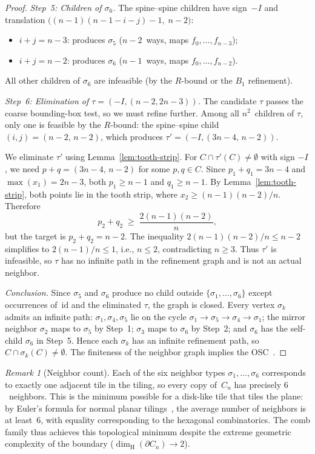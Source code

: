\documentclass{amsart}
\theoremstyle{definition}
\theoremstyle{remark}
\newtheorem{remark}[theorem]{Remark}
\newcommand{\dH}{\dim_{\mathrm{H}}}
\begin{document}
\begin{proof}
\emph{Step~5: Children of $\sigma_6$.}
The spine--spine children have sign~$-I$ and translation
$\bigl((n{-}1)(n{-}1{-}i{-}j) - 1,\; n{-}2\bigr)$:
\begin{itemize}
\item $i + j = n{-}3$: produces $\sigma_5$
  ($n{-}2$~ways, maps $f_0, \ldots, f_{n-3}$);
\item $i + j = n{-}2$: produces $\sigma_6$
  ($n{-}1$~ways, maps $f_0, \ldots, f_{n-2}$).
\end{itemize}
All other children of $\sigma_6$ are infeasible (by the $R$-bound or
the $B_1$ refinement).

\emph{Step~6: Elimination of $\tau = (-I, (n{-}2, 2n{-}3))$.}
The candidate $\tau$ passes the coarse bounding-box test, so we must
refine further.  Among all $n^2$~children of $\tau$, only one is
feasible by the $R$-bound: the spine--spine child
$(i, j) = (n{-}2,\, n{-}2)$, which produces
$\tau' = (-I, (3n{-}4,\, n{-}2))$.

We eliminate $\tau'$ using Lemma~\ref{lem:tooth-strip}.  For
$C \cap \tau'(C) \ne \emptyset$ with sign $-I$, we need
$p + q = (3n{-}4,\, n{-}2)$ for some $p, q \in C$.
Since $p_1 + q_1 = 3n{-}4$ and $\max(x_1) = 2n{-}3$, both
$p_1 \ge n{-}1$ and $q_1 \ge n{-}1$.  By
Lemma~\ref{lem:tooth-strip}, both points lie in the tooth strip, where
$x_2 \ge (n{-}1)(n{-}2)/n$.  Therefore
\[
  p_2 + q_2 \;\ge\; \frac{2(n{-}1)(n{-}2)}{n},
\]
but the target is $p_2 + q_2 = n{-}2$.  The inequality
$2(n{-}1)(n{-}2)/n \le n{-}2$ simplifies to $2(n{-}1)/n \le 1$,
i.e., $n \le 2$, contradicting $n \ge 3$.
Thus $\tau'$ is infeasible, so $\tau$ has no infinite path in the
refinement graph and is not an actual neighbor.

\emph{Conclusion.}
Since $\sigma_5$ and $\sigma_6$ produce no child outside
$\{\sigma_1, \ldots, \sigma_6\}$ except occurrences of~$\mathrm{id}$
and the eliminated $\tau$, the graph is closed.  Every vertex
$\sigma_k$ admits an infinite path: $\sigma_1,\sigma_4,\sigma_5$ lie on the cycle
$\sigma_1 \to \sigma_5 \to \sigma_4 \to \sigma_1$; the mirror
neighbor $\sigma_2$ maps to $\sigma_5$ by Step~1; $\sigma_3$ maps
to $\sigma_6$ by Step~2; and $\sigma_6$ has the self-child
$\sigma_6$ in Step~5.  Hence each $\sigma_k$ has an infinite
refinement path, so $C \cap \sigma_k(C) \ne \emptyset$.
The finiteness of the neighbor graph implies the OSC~\cite{lau-ngai}.
\end{proof}

\begin{remark}[Neighbor count]
\label{rem:neighbor-count}
Each of the six neighbor types $\sigma_1, \ldots, \sigma_6$ corresponds
to exactly one adjacent tile in the tiling, so every copy of~$C_n$ has
precisely $6$~neighbors.  This is the minimum possible for a disk-like
tile that tiles the plane: by Euler's formula for normal planar
tilings~\cite[Section~3.3]{grunbaum-shephard},
the average number of neighbors is at least~$6$, with equality
corresponding to the hexagonal combinatorics.  The comb family thus
achieves this topological minimum despite the extreme geometric
complexity of the boundary ($\dH(\partial C_n) \to 2$).
\end{remark}
\end{document}
